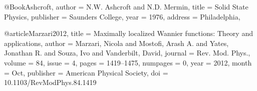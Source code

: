 \begin{thebibliography}{99}
\setlength{\parskip}{1em}


@Book{Ashcroft,
  author = 	 {N.W. Ashcroft and N.D. Mermin},
  title = 	 {{Solid State Physics}},
  publisher = 	 {Saunders College},
  year = 	 1976,
  address = 	 {Philadelphia},
}

\end{thebibliography}

@article{Marzari2012,
  title = {Maximally localized Wannier functions: Theory and applications},
  author = {Marzari, Nicola and Mostofi, Arash A. and Yates, Jonathan R. and Souza, Ivo and Vanderbilt, David},
  journal = {Rev. Mod. Phys.},
  volume = {84},
  issue = {4},
  pages = {1419--1475},
  numpages = {0},
  year = {2012},
  month = {Oct},
  publisher = {American Physical Society},
  doi = {10.1103/RevModPhys.84.1419}
}
